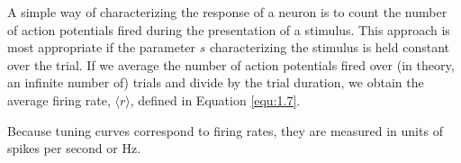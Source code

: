 \begin{rem}
  A simple way of characterizing the response of a neuron is to count the
number of action potentials fired during the presentation of a stimulus.
This approach is most appropriate if the parameter $s$ characterizing the
stimulus is held constant over the trial. If we average the number of action potentials 
fired over (in theory, an infinite number of) trials and divide by the trial duration, 
we obtain the average firing rate, $ \langle r\rangle$, defined in Equation \ref{equ:1.7}.
\end{rem}

\begin{ntn}
  Because tuning curves correspond to firing rates, they are measured in units of spikes 
  per second or Hz.
\end{ntn}

